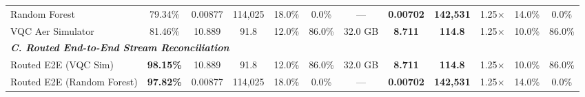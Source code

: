 \begin{table}[htbp]
{\begin{tabular}{lcccccc|ccccc}
Random Forest & 79.34\% & 0.00877 & 114,025 & 18.0\% & 0.0\% & --- & \textbf{0.00702} & \textbf{142,531} & 1.25$\times$ & 14.0\% & 0.0\% \\
VQC Aer Simulator & 81.46\% & 10.889 & 91.8 & 12.0\% & 86.0\% & 32.0 GB & \textbf{8.711} & \textbf{114.8} & 1.25$\times$ & 10.0\% & 86.0\% \\
\midrule
\multicolumn{12}{l}{\textit{\textbf{C. Routed End-to-End Stream Reconciliation}}} \\
Routed E2E (VQC Sim) & \textbf{98.15\%} & 10.889 & 91.8 & 12.0\% & 86.0\% & 32.0 GB & \textbf{8.711} & \textbf{114.8} & 1.25$\times$ & 10.0\% & 86.0\% \\
Routed E2E (Random Forest) & \textbf{97.82\%} & 0.00877 & 114,025 & 18.0\% & 0.0\% & --- & \textbf{0.00702} & \textbf{142,531} & 1.25$\times$ & 14.0\% & 0.0\% \\
\bottomrule
\end{tabular}%
}
\end{table}

